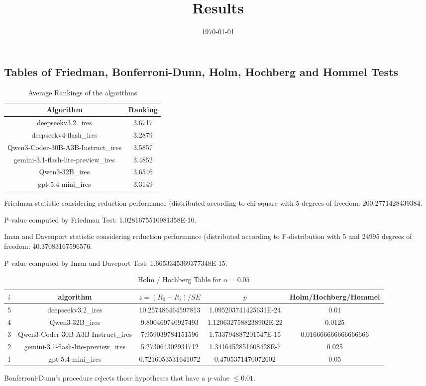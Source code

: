 \documentclass[a4paper,10pt]{article}
\title{Results}
\date{\today}
\begin{document}
\begin{landscape}
\oddsidemargin 0in \topmargin 0in\maketitle
\section{Tables of Friedman, Bonferroni-Dunn, Holm, Hochberg and Hommel Tests}
\begin{table}[!htp]
\centering
\caption{Average Rankings of the algorithms
}\begin{tabular}{c|c}
Algorithm&Ranking\\
\hline
deepseekv3.2_ires&3.6717\\
deepseekv4-flash_ires&3.2879\\
Qwen3-Coder-30B-A3B-Instruct_ires&3.5857\\
gemini-3.1-flash-lite-preview_ires&3.4852\\
Qwen3-32B_ires&3.6546\\
gpt-5.4-mini_ires&3.3149\\
\end{tabular}
\end{table}


Friedman statistic considering reduction performance (distributed according to chi-square with 5 degrees of freedom: 200.2771428439384.


P-value computed by Friedman Test: 1.0281675510981358E-10.\newline

Iman and Davenport statistic considering reduction performance (distributed according to F-distribution with 5 and 24995 degrees of freedom: 40.37083167596576.


P-value computed by Iman and Daveport Test: 1.6653345369377348E-15.\newline

\begin{table}[!htp]
\centering\tiny
\caption{Holm / Hochberg Table for $\alpha=0.05$}
\begin{tabular}{ccccc}
$i$&algorithm&$z=(R_0 - R_i)/SE$&$p$&Holm/Hochberg/Hommel\\
\hline
5&deepseekv3.2_ires&10.257486464597813&1.095203741425631E-24&0.01\\
4&Qwen3-32B_ires&9.800469740927493&1.1206327588238902E-22&0.0125\\
3&Qwen3-Coder-30B-A3B-Instruct_ires&7.959039784151596&1.733794887201547E-15&0.016666666666666666\\
2&gemini-3.1-flash-lite-preview_ires&5.273064302931712&1.3416452851608428E-7&0.025\\
1&gpt-5.4-mini_ires&0.7216053531641072&0.4705371470072602&0.05\\
\hline
\end{tabular}
\end{table}
Bonferroni-Dunn's procedure rejects those hypotheses that have a p-value $\le0.01$.



\end{landscape}
\end{document}
